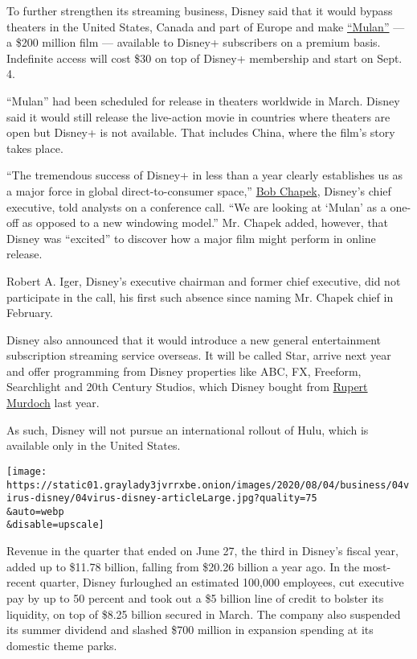 To further strengthen its streaming business, Disney said that it would
bypass theaters in the United States, Canada and part of Europe and make
\href{https://www.nytimes3xbfgragh.onion/2020/06/12/business/media/tenet-release-delayed.html?searchResultPosition=1}{``Mulan''}
--- a \$200 million film --- available to Disney+ subscribers on a
premium basis. Indefinite access will cost \$30 on top of Disney+
membership and start on Sept. 4.

``Mulan'' had been scheduled for release in theaters worldwide in March.
Disney said it would still release the live-action movie in countries
where theaters are open but Disney+ is not available. That includes
China, where the film's story takes place.

``The tremendous success of Disney+ in less than a year clearly
establishes us as a major force in global direct-to-consumer space,''
\href{https://www.nytimes3xbfgragh.onion/2020/02/26/business/media/bob-chapek-disney-ceo.html?searchResultPosition=8}{Bob
Chapek}, Disney's chief executive, told analysts on a conference call.
``We are looking at `Mulan' as a one-off as opposed to a new windowing
model.'' Mr. Chapek added, however, that Disney was ``excited'' to
discover how a major film might perform in online release.

Robert A. Iger, Disney's executive chairman and former chief executive,
did not participate in the call, his first such absence since naming Mr.
Chapek chief in February.

Disney also announced that it would introduce a new general
entertainment subscription streaming service overseas. It will be called
Star, arrive next year and offer programming from Disney properties like
ABC, FX, Freeform, Searchlight and 20th Century Studios, which Disney
bought from
\href{https://www.nytimes3xbfgragh.onion/2019/03/20/business/media/walt-disney-21st-century-fox-deal.html}{Rupert
Murdoch} last year.

As such, Disney will not pursue an international rollout of Hulu, which
is available only in the United States.

\texttt{[image: https://static01.graylady3jvrrxbe.onion/images/2020/08/04/business/04virus-disney/04virus-disney-articleLarge.jpg?quality=75\\\&auto=webp\\\&disable=upscale]}

Revenue in the quarter that ended on June 27, the third in Disney's
fiscal year, added up to \$11.78 billion, falling from \$20.26 billion a
year ago. In the most-recent quarter, Disney furloughed an estimated
100,000 employees, cut executive pay by up to 50 percent and took out a
\$5 billion line of credit to bolster its liquidity, on top of \$8.25
billion secured in March. The company also suspended its summer dividend
and slashed \$700 million in expansion spending at its domestic theme
parks.

